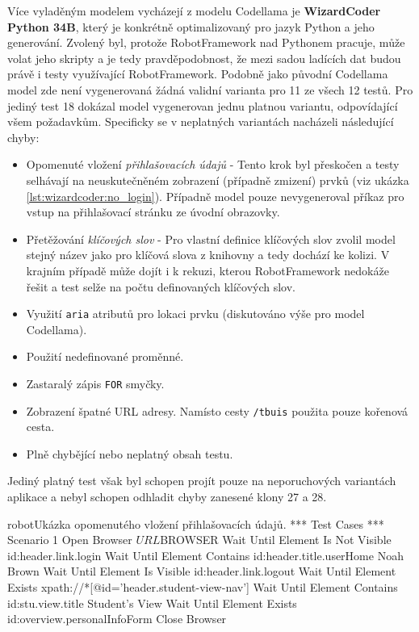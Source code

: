 \documentclass[czech, ma, kiv, he, iso690alph, pdf, viewonly]{fasthesis}
\begin{document}
            Více vyladěným modelem vycházejí z modelu Codellama je \textbf{WizardCoder Python 34B}, který je konkrétně optimalizovaný pro jazyk Python a jeho generování. Zvolený byl, protože RobotFramework nad Pythonem pracuje, může volat jeho skripty a je tedy pravděpodobnost, že mezi sadou ladících dat budou právě i testy využívající RobotFramework. Podobně jako původní Codellama model zde není vygenerovaná žádná validní varianta pro 11 ze všech 12 testů. Pro jediný test 18 dokázal model vygenerovan jednu platnou variantu, odpovídající všem požadavkům. Specificky se v neplatných variantách nacházeli následující chyby:
            \begin{itemize}
                \item Opomenuté vložení \textit{přihlašovacích údajů} - Tento krok byl přeskočen a testy selhávají na neuskutečněném zobrazení (případně zmizení) prvků (viz ukázka \ref{lst:wizardcoder:no_login}). Případně model pouze nevygeneroval příkaz pro vstup na přihlašovací stránku ze úvodní obrazovky.
                \item Přetěžování \textit{klíčových slov} - Pro vlastní definice klíčových slov zvolil model stejný název jako pro klíčová slova z knihovny a tedy dochází ke kolizi. V krajním případě může dojít i k rekuzi, kterou RobotFramework nedokáže řešit a test selže na počtu definovaných klíčových slov.
                \item Využití \verb|aria| atributů pro lokaci prvku (diskutováno výše pro model Codellama).
                \item Použití nedefinované proměnné.
                \item Zastaralý zápis \verb|FOR| smyčky.
                \item Zobrazení špatné URL adresy. Namísto cesty \verb|/tbuis| použita pouze kořenová cesta.
                \item Plně chybějící nebo neplatný obsah testu.
            \end{itemize}
            \noindent Jediný platný test však byl schopen projít pouze na neporuchových variantách aplikace a nebyl schopen odhladit chyby zanesené klony 27 a 28.

            \begin{code}{robot}{Ukázka opomenutého vložení přihlašovacích údajů. \label{lst:wizardcoder:no_login}}
*** Test Cases ***
Scenario 1
    Open Browser    ${URL}    ${BROWSER}
    Wait Until Element Is Not Visible    id:header.link.login
    Wait Until Element Contains    id:header.title.userHome    Noah Brown
    Wait Until Element Is Visible    id:header.link.logout
    Wait Until Element Exists    xpath://*[@id='header.student-view-nav']
    Wait Until Element Contains    id:stu.view.title    Student's View
    Wait Until Element Exists    id:overview.personalInfoForm
    Close Browser
            \end{code}
\end{document}

